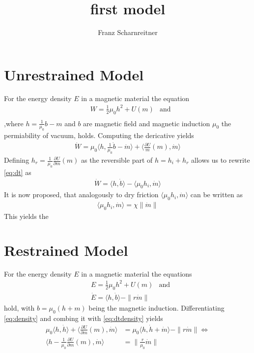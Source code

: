 \documentclass[a4paper,10pt]{article}
\title{first model}
\author{Franz Scharnreitner}
\begin{document}
\maketitle

\section{Unrestrained Model}


For the energy density $E$ in a magnetic material the equation
\begin{align}
    &W = \frac{1}{2} \mu_0 h^2 + U(m) & \text{and} \label{eq:density1} \\
\end{align} ,where $h = \frac{1}{\mu_0} b - m$ and $b$ are magnetic field and magnetic induction $\mu_0$ the permiability of vacuum, holds.
Computing the dericative yields
\begin{align} \label{eq:dt}
\dot W = \mu_0 \langle h,\frac{1}{\mu_0} \dot b - \dot m \rangle + \langle \frac{\partial U}{m}(m), \dot m \rangle
\end{align}
Defining $h_r = \frac{1}{\mu_0} \frac{\partial U}{\partial m}(m)$ as the reversible part of $h = h_i + h_r$ allows us to
rewrite \eqref{eq:dt} as
\begin{align}
 \dot W = \langle h, \dot b \rangle - \langle \mu_0 h_i,\dot m \rangle
\end{align}
It is now proposed, that analogously to dry friction $\langle \mu_0 h_i,\dot m \rangle$ can be written as
\begin{align}
 \langle \mu_0 h_i,\dot m \rangle = \chi \|\dot m \|
\end{align}
This yields the

\section{Restrained Model}

For the energy density $E$ in a magnetic material the equations
\begin{align}
    &E = \frac{1}{2} \mu_0 h^2 + U(m) & \text{and} \label{eq:density} \\
    &\dot E= \langle h, \dot b \rangle - \|r\dot m\| \label{eq:dtdensity}
\end{align}
hold, with $b = \mu_0(h + m)$ being the magnetic induction. Differentiating \eqref{eq:density} and combing it with \eqref{eq:dtdensity} yields
\begin{align}
    \mu_0 \langle h,\dot h \rangle + \langle \frac{\partial U}{\partial m}(m), \dot m \rangle &= \mu_0 \langle h,\dot h + \dot m \rangle - \|r \dot m\| \Leftrightarrow \\
    \langle h - \frac{1}{\mu_0} \frac{\partial U}{\partial m}(m), \dot m \rangle &= \|\frac{r}{\mu_0} \dot m \| \label{eq:4}
\end{align}
\end{document}
